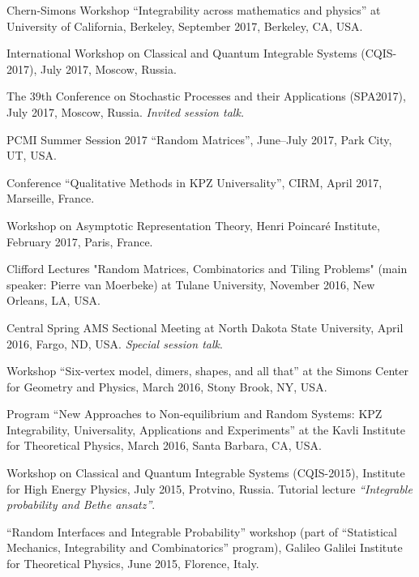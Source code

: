 \documentclass[letterpaper,11pt]{article}
\begin{document}
\begin{etaremune}
	\item Chern-Simons Workshop
		``Integrability across mathematics and physics'' 
		 at University of California, Berkeley,
			September 2017, Berkeley, CA, USA.
	\item
	      International Workshop on Classical and Quantum Integrable
	      Systems (CQIS-2017), July 2017, Moscow, Russia.
	\item
	      The 39th Conference on Stochastic Processes and their
	      Applications (SPA2017), July 2017, Moscow, Russia.
				\emph{Invited session talk.}

	\item
	      PCMI Summer Session 2017 ``Random Matrices'', June--July 2017,
	      Park City, UT, USA.

	\item
	      Conference ``Qualitative Methods in KPZ Universality'', CIRM,
	      April 2017, Marseille, France.

	\item
	      Workshop on Asymptotic Representation Theory, Henri Poincar\'e
	      Institute, February 2017, Paris, France.

	\item
	      Clifford Lectures "Random Matrices, Combinatorics and Tiling
	      Problems" (main speaker: Pierre van Moerbeke) at Tulane University, November
	      2016, New Orleans, LA, USA.

	\item
	      Central Spring AMS Sectional Meeting at North Dakota State
	      University, April 2016, Fargo, ND, USA. \emph{Special session talk}.

	\item
	      Workshop ``Six-vertex model, dimers, shapes, and all that'' at
	      the Simons Center for Geometry and Physics, March 2016, Stony Brook, NY, USA.

	\item
	      Program ``New Approaches to Non-equilibrium and Random Systems:
	      KPZ Integrability, Universality, Applications and Experiments'' at the Kavli
	      Institute for Theoretical Physics, March 2016, Santa Barbara, CA, USA.

	\item
	      Workshop on Classical and Quantum Integrable Systems
	      (CQIS-2015), Institute for High Energy Physics, July 2015, Protvino, Russia.
	      Tutorial lecture \emph{``Integrable probability and Bethe   ansatz''}.

	\item
	      ``Random Interfaces and Integrable Probability'' workshop (part
	      of ``Statistical Mechanics, Integrability and Combinatorics''
	      program), Galileo Galilei Institute for Theoretical Physics, June 2015,
	      Florence, Italy.


\end{etaremune}
\end{document}
